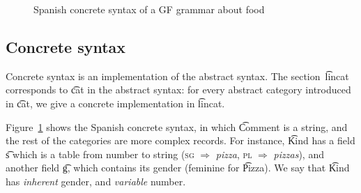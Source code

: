 \begin{figure}[h]
\begin{Shaded}
\begin{Highlighting}[]
                  \FunctionTok{=} 
     \FunctionTok{=}  \FunctionTok{|}  \NormalTok{;}
     \FunctionTok{=}  \FunctionTok{|}  \NormalTok{;}
     \FunctionTok{=}  \FunctionTok{|}  \NormalTok{;}
  \FunctionTok{=}
      \FunctionTok{=}   \NormalTok{\{ } \OtherTok{=>}  \OtherTok{=>} 
       \FunctionTok{=} \FunctionTok{++} \FunctionTok{!}  \NormalTok{;} \FunctionTok{=}  \FunctionTok{=} 
    \FunctionTok{=}  \OtherTok{=>}  \NormalTok{; } \OtherTok{=>}  \NormalTok{\} ;}
    \FunctionTok{=}   \NormalTok{\{ } \OtherTok{=>} \FunctionTok{++}  \OtherTok{=>} \FunctionTok{++} 
\end{Highlighting}
\end{Shaded}
  \caption{Spanish concrete syntax of a GF grammar about food}
\label{fig:spanish}
\end{figure}

\subsection{Concrete syntax}
Concrete syntax is an implementation of the abstract syntax.
The section~\t{lincat} corresponds to \t{cat} in the abstract syntax:
for every abstract category introduced in \t{cat}, we give a concrete
implementation in \t{lincat}.


Figure~\ref{fig:spanish} shows the Spanish concrete
syntax, in which \t{Comment} is a string, and the rest of the
categories are more complex records. For instance, \t{Kind} has a
field \t{s} which is a table from number to string (\textsc{sg} $\Rightarrow$
\emph{pizza}, \textsc{pl} $\Rightarrow$ \emph{pizzas}), and another
field \t{g}, which contains its gender (feminine for \t{Pizza}). We
say that \t{Kind} has \emph{inherent} gender, and \emph{variable} number. 

